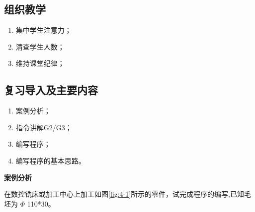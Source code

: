 \jxhj{%
	}

\makeshouye %

\subsection{组织教学}
\begin{enumerate}[1、]
	\item 集中学生注意力；
	\item 清查学生人数；
	\item 维持课堂纪律；
\end{enumerate}
\subsection{复习导入及主要内容}
\begin{enumerate}[1、]
\item 案例分析；
\item 指令讲解G2/G3；
\item 编写程序；
\item 编写程序的基本思路。
\end{enumerate}

\textbf{案例分析}

在数控铣床或加工中心上加工如图\ref{fig:4-1}所示的零件，试完成程序的编写,已知毛坯为 $\Phi$ 110*30。

